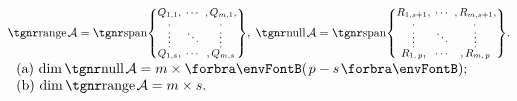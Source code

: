 $\range\mA={}\Spn{\small\begin{Bmatrix} \underset{\;,}{Q_{1,1}}, &\hspace{-6pt} \cdots &\hspace{-6pt} ,\underset{\!,}{Q_{m,1}},\\[-2pt] \vdots &\hspace{-6pt} \ddots &\hspace{-6pt} \vdots\\[-2pt] \overset{\;,}{Q_{1,s}}, &\hspace{-6pt} \cdots &\hspace{-6pt} ,\overset{\!\!\!,}{Q_{m,s}}\end{Bmatrix}},\;\null \mA=\Spn{\small\begin{Bmatrix} \underset{\;,}{R_{1,s+1}}, &\hspace{-6pt} \cdots &\hspace{-6pt} ,\underset{\!\!,}{R_{m,s+1}},\\[-2pt] \vdots &\hspace{-6pt} \ddots &\hspace{-6pt} \vdots\\[-2pt] \overset{\;,}{R_{1,\,p}}, &\hspace{-6pt} \cdots &\hspace{-6pt} ,\overset{\!\!\!,}{R_{m,\,p}}\end{Bmatrix}}.$
\;\;$\hText{$
(a) $\dim\null \mA=m\times\Par{p-s};\\$
(b) $\dim\range \mA=m\times s.}$\par\PfEnd[-10pt]\vspace{-4pt}
\SepLine

